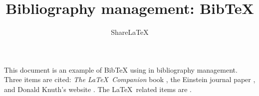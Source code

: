 \documentclass[a4paper,10pt]{article}
\title{Bibliography management: BibTeX}
\author{Share\LaTeX}
\begin{document}
\maketitle

This document is an example of BibTeX using in bibliography management. Three items are cited: \textit{The \LaTeX\ Companion} book \cite{latexcompanion}, the Einstein journal paper \cite{einstein}, and Donald Knuth's website \cite{knuthwebsite}. The \LaTeX\ related items are \cite{latexcompanion,knuthwebsite}. 

\medskip


\end{document}
